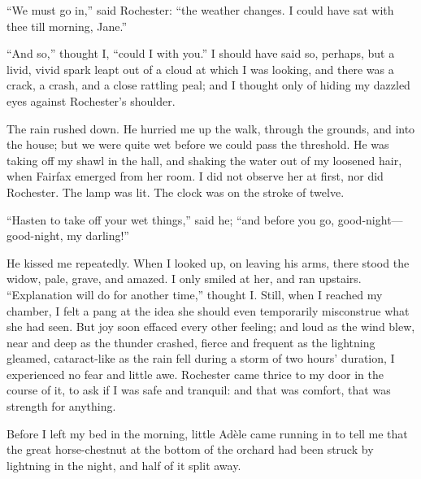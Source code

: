 \enquote{We must go in,} said \Mr{} Rochester: \enquote{the weather
changes. I could have sat with thee till morning, Jane.}

\enquote{And so,} thought I, \enquote{could I with you.} I should have
said so, perhaps, but a livid, vivid spark leapt out of a cloud at which
I was looking, and there was a crack, a crash, and a close rattling
peal; and I thought only of hiding my dazzled eyes against \Mr{}
 Rochester's shoulder.

The rain rushed down. He hurried me up the walk, through the grounds,
and into the house; but we were quite wet before we could pass the
threshold. He was taking off my shawl in the hall, and shaking the
water out of my loosened hair, when \Mrs{} Fairfax emerged from her room. 
I did not observe her at first, nor did \Mr{} Rochester. The lamp was
lit. The clock was on the stroke of twelve.

\enquote{Hasten to take off your wet things,} said he; \enquote{and
before you go, good-night---good-night, my darling!}

He kissed me repeatedly. When I looked up, on leaving his arms, there
stood the widow, pale, grave, and amazed. I only smiled at her, and ran
upstairs. \enquote{Explanation will do for another time,} thought I\@. 
Still, when I reached my chamber, I felt a pang at the idea she should
even temporarily misconstrue what she had seen. But joy soon effaced
every other feeling; and loud as the wind blew, near and deep as the
thunder crashed, fierce and frequent as the lightning gleamed,
cataract-like as the rain fell during a storm of two hours' duration, I
experienced no fear and little awe. \Mr{} Rochester came thrice to my
door in the course of it, to ask if I was safe and tranquil: and that
was comfort, that was strength for anything.

Before I left my bed in the morning, little Adèle came running in to
tell me that the great horse-chestnut at the bottom of the orchard had
been struck by lightning in the night, and half of it split away.
